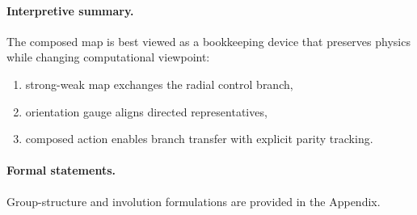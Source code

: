 \paragraph{Interpretive summary.}
The composed map is best viewed as a bookkeeping device that preserves physics while changing
computational viewpoint:
\begin{enumerate}
  \item strong-weak map exchanges the radial control branch,
  \item orientation gauge aligns directed representatives,
  \item composed action enables branch transfer with explicit parity tracking.
\end{enumerate}

\paragraph{Formal statements.}
Group-structure and involution formulations are provided in
the Appendix.
